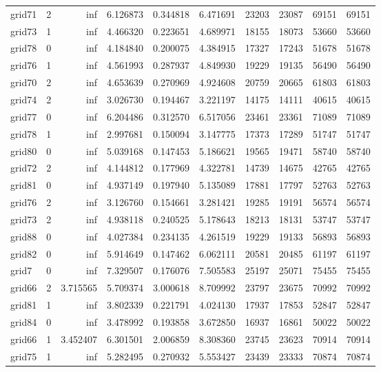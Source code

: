\begin{longtable}{|l|r|r|r|r|r|r|r|r|r|}
grid71 & 2 & inf & 6.126873 & 0.344818 & 6.471691 & 23203 & 23087 & 69151 & 69151 \\
grid73 & 1 & inf & 4.466320 & 0.223651 & 4.689971 & 18155 & 18073 & 53660 & 53660 \\
grid78 & 0 & inf & 4.184840 & 0.200075 & 4.384915 & 17327 & 17243 & 51678 & 51678 \\
grid76 & 1 & inf & 4.561993 & 0.287937 & 4.849930 & 19229 & 19135 & 56490 & 56490 \\
grid70 & 2 & inf & 4.653639 & 0.270969 & 4.924608 & 20759 & 20665 & 61803 & 61803 \\
grid74 & 2 & inf & 3.026730 & 0.194467 & 3.221197 & 14175 & 14111 & 40615 & 40615 \\
grid77 & 0 & inf & 6.204486 & 0.312570 & 6.517056 & 23461 & 23361 & 71089 & 71089 \\
grid78 & 1 & inf & 2.997681 & 0.150094 & 3.147775 & 17373 & 17289 & 51747 & 51747 \\
grid80 & 0 & inf & 5.039168 & 0.147453 & 5.186621 & 19565 & 19471 & 58740 & 58740 \\
grid72 & 2 & inf & 4.144812 & 0.177969 & 4.322781 & 14739 & 14675 & 42765 & 42765 \\
grid81 & 0 & inf & 4.937149 & 0.197940 & 5.135089 & 17881 & 17797 & 52763 & 52763 \\
grid76 & 2 & inf & 3.126760 & 0.154661 & 3.281421 & 19285 & 19191 & 56574 & 56574 \\
grid73 & 2 & inf & 4.938118 & 0.240525 & 5.178643 & 18213 & 18131 & 53747 & 53747 \\
grid88 & 0 & inf & 4.027384 & 0.234135 & 4.261519 & 19229 & 19133 & 56893 & 56893 \\
grid82 & 0 & inf & 5.914649 & 0.147462 & 6.062111 & 20581 & 20485 & 61197 & 61197 \\
grid7 & 0 & inf & 7.329507 & 0.176076 & 7.505583 & 25197 & 25071 & 75455 & 75455 \\
grid66 & 2 & 3.715565 & 5.709374 & 3.000618 & 8.709992 & 23797 & 23675 & 70992 & 70992 \\
grid81 & 1 & inf & 3.802339 & 0.221791 & 4.024130 & 17937 & 17853 & 52847 & 52847 \\
grid84 & 0 & inf & 3.478992 & 0.193858 & 3.672850 & 16937 & 16861 & 50022 & 50022 \\
grid66 & 1 & 3.452407 & 6.301501 & 2.006859 & 8.308360 & 23745 & 23623 & 70914 & 70914 \\
grid75 & 1 & inf & 5.282495 & 0.270932 & 5.553427 & 23439 & 23333 & 70874 & 70874 \\

\end{longtable}
